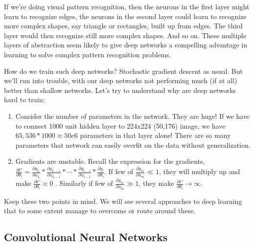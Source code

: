 \documentclass[a4paper]{tufte-handout}
\begin{document}
If we're doing visual pattern recognition, then the neurons in the first
layer might learn to recognize edges, the neurons in the second layer
could learn to recognize more complex shapes, say triangle or
rectangles, built up from edges. The third layer would then recognize
still more complex shapes. And so on. These multiple layers of
abstraction seem likely to give deep networks a compelling advantage in
learning to solve complex pattern recognition problems.

How do we train such deep networks? Stochastic gradient descent as
usual. But we'll run into trouble, with our deep networks not performing
much (if at all) better than shallow networks.
Let's try to understand why are deep networks hard to train:

\begin{enumerate}
\item
  Consider the number of parameters in the network. They are huge! If we
  have to connect 1000 unit hidden layer to 224x224 (50,176) image, we
  have \(65,536*1000 \approx 50e6\) parameters in that layer alone!
  There are so many parameters that network can easily overfit on the
  data without generalization.
\item
  Gradients are unstable. Recall the expression for the gradients,
  \(\frac{\partial C}{\partial \theta_l} = \frac{\partial y_L}{\partial u_L} * \frac{\partial y_{L-1}}{\partial u_{L-1}} * \cdots * \frac{\partial y_{l-1}}{\partial u_{l-1}} * \frac{\partial y_l}{\partial \theta_l}\).
  If few of \(\frac{\partial y_m}{\partial u_m} \ll 1\), they will
  multiply up and make
  \(\frac{\partial C}{\partial \theta_l} \approx 0\)
  . Similarly if few of
  \(\frac{\partial y_m}{\partial u_m} \gg 1\), they make
  \(\frac{\partial C}{\partial \theta_l} \to \infty\). 
\end{enumerate}

Keep these two points in mind. We will see several approaches to deep
learning that to some extent manage to overcome or route around these.


\subsection{Convolutional Neural
Networks}\label{convolutional-neural-networks}
\end{document}

